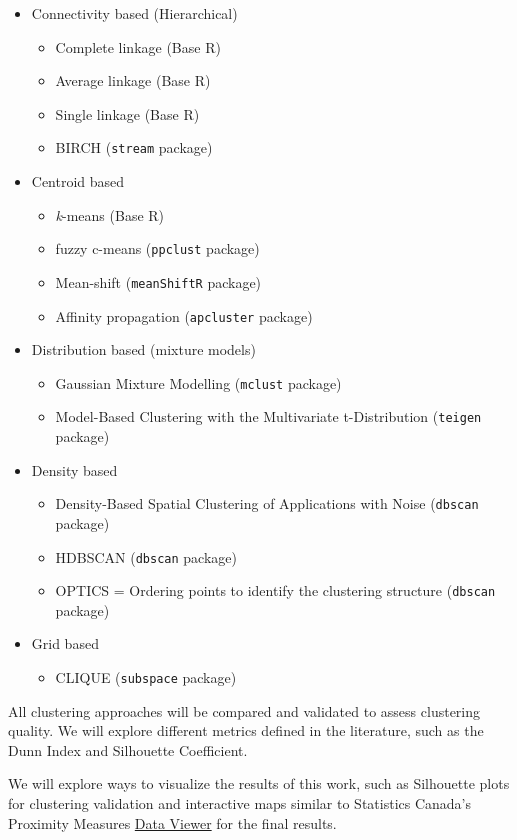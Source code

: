 \documentclass[11pt, a4paper]{article}
\begin{document}
\begin{itemize}
\item Connectivity based (Hierarchical) 
\begin{itemize}
	\item Complete linkage (Base R)
	\item Average linkage (Base R)
	\item Single linkage (Base R)
	\item BIRCH (\texttt{stream} package)
\end{itemize}
\item Centroid based
\begin{itemize}
	\item \textit{k}-means (Base R)
	\item fuzzy c-means (\texttt{ppclust} package)
   	\item Mean-shift (\texttt{meanShiftR} package)
   	\item Affinity propagation (\texttt{apcluster} package)
\end{itemize}
\item Distribution based (mixture models)
\begin{itemize}
	\item Gaussian Mixture Modelling (\texttt{mclust} package)
   	\item Model-Based Clustering with the Multivariate t-Distribution (\texttt{teigen} package)
\end{itemize}
\item Density based
\begin{itemize}
	\item Density-Based Spatial Clustering of Applications with Noise (\texttt{dbscan} package)
	\item HDBSCAN (\texttt{dbscan} package) 
	\item OPTICS = Ordering points to identify the clustering structure (\texttt{dbscan} package) 
\end{itemize}
\item Grid based
\begin{itemize}
	\item CLIQUE (\texttt{subspace} package)
\end{itemize}
\end{itemize}

All clustering approaches will be compared and validated to assess clustering quality. We will explore different metrics defined in the literature, such as the Dunn Index and Silhouette Coefficient. 
\par 
We will explore ways to visualize the results of this work, such as Silhouette plots for clustering validation and interactive maps similar to Statistics Canada’s Proximity Measures \href{https://www150.statcan.gc.ca/n1/pub/71-607-x/71-607-x2020011-eng.htm}{Data Viewer} for the final results. 
\end{document}
